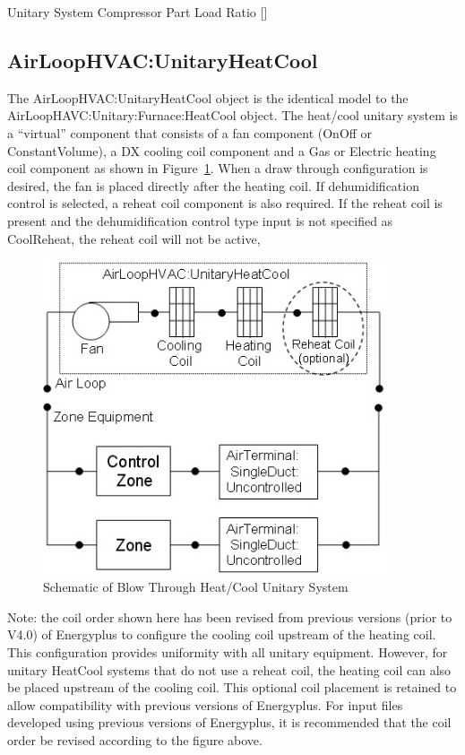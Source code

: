 Unitary System Compressor Part Load Ratio {[]}

\subsection{AirLoopHVAC:UnitaryHeatCool}\label{airloophvacunitaryheatcool}

The AirLoopHVAC:UnitaryHeatCool object is the identical model to the AirLoopHAVC:Unitary:Furnace:HeatCool object. The heat/cool unitary system is a ``virtual'' component that consists of a fan component (OnOff or ConstantVolume), a DX cooling coil component and a Gas or Electric heating coil component as shown in Figure~\ref{fig:schematic-of-blow-through-heatcool-unitary}. When a draw through configuration is desired, the fan is placed directly after the heating coil. If dehumidification control is selected, a reheat coil component is also required. If the reheat coil is present and the dehumidification control type input is not specified as CoolReheat, the reheat coil will not be active,

\begin{figure}[hbtp] %
\centering
\includegraphics[width=0.9\textwidth, height=0.9\textheight, keepaspectratio=true]{media/image299.png}
\caption{Schematic of Blow Through Heat/Cool Unitary System \protect \label{fig:schematic-of-blow-through-heatcool-unitary}}
\end{figure}

Note: the coil order shown here has been revised from previous versions (prior to V4.0) of Energyplus to configure the cooling coil upstream of the heating coil. This configuration provides uniformity with all unitary equipment. However, for unitary HeatCool systems that do not use a reheat coil, the heating coil can also be placed upstream of the cooling coil. This optional coil placement is retained to allow compatibility with previous versions of Energyplus. For input files developed using previous versions of Energyplus, it is recommended that the coil order be revised according to the figure above.

